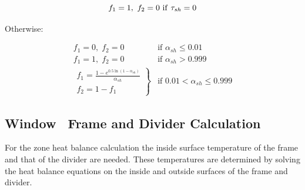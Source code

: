 \begin{equation}
{f_1} = 1,~{\rm{ }}{f_2} = 0{\rm{~if~}}{\tau_{sh}} = 0
\end{equation}

Otherwise:

\begin{equation}
  \begin{array}{cl}
    f_1 = 0,\;f_2 = 0 &\text{if~} \alpha_{sh} \le 0.01 \\
    f_1 = 1,\;f_2 = 0 &\text{if~} \alpha_{sh} > 0.999 \\
    \left.
      \begin{array}{l}
        f_1 = \frac{1 - e^{0.5 \ln (1 - \alpha_{sh})}} {\alpha_{sh}} \\
        f_2 = 1 - {f_1}
      \end{array}
    \right\} &\text{if~} 0.01 < \alpha_{sh} \le 0.999
  \end{array}
\end{equation}

\subsection{Window~ Frame and Divider Calculation}\label{window-frame-and-divider-calculation}

For the zone heat balance calculation the inside surface temperature of the frame and that of the divider are needed. These temperatures are determined by solving the heat balance equations on the inside and outside surfaces of the frame and divider.

